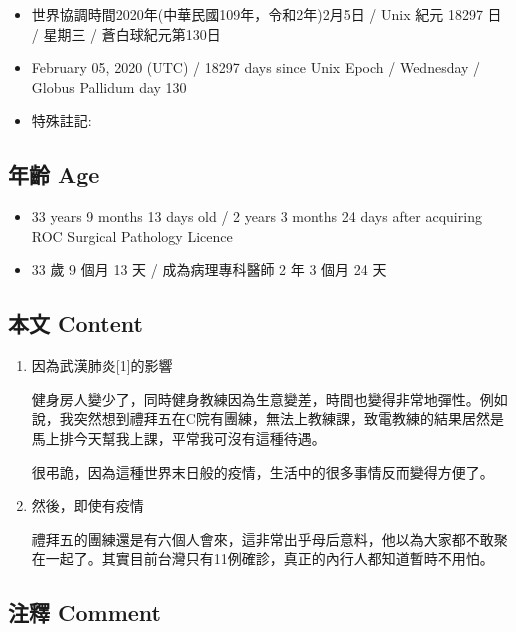 \documentclass[a5paper, 12pt
]{book}
\providecommand{\tightlist}{%
  \setlength{\itemsep}{0pt}\setlength{\parskip}{0pt}}
\begin{document}
\begin{itemize}
\tightlist
\item
  世界協調時間2020年(中華民國109年，令和2年)2月5日 / Unix 紀元 18297 日
  / 星期三 / 蒼白球紀元第130日
\item
  February 05, 2020 (UTC) / 18297 days since Unix Epoch / Wednesday /
  Globus Pallidum day 130
\item
  特殊註記:
\end{itemize}

\hypertarget{ux5e74ux9f61-age-66}{%
\subsection{年齡 Age}\label{ux5e74ux9f61-age-66}}

\begin{itemize}
\tightlist
\item
  33 years 9 months 13 days old / 2 years 3 months 24 days after
  acquiring ROC Surgical Pathology Licence
\item
  33 歲 9 個月 13 天 / 成為病理專科醫師 2 年 3 個月 24 天
\end{itemize}

\hypertarget{ux672cux6587-content-66}{%
\subsection{本文 Content}\label{ux672cux6587-content-66}}

\begin{enumerate}
\def\labelenumi{\arabic{enumi}.}
\item
  因為武漢肺炎{[}1{]}的影響

  健身房人變少了，同時健身教練因為生意變差，時間也變得非常地彈性。例如說，我突然想到禮拜五在C院有團練，無法上教練課，致電教練的結果居然是馬上排今天幫我上課，平常我可沒有這種待遇。

  很弔詭，因為這種世界末日般的疫情，生活中的很多事情反而變得方便了。
\item
  然後，即使有疫情

  禮拜五的團練還是有六個人會來，這非常出乎母后意料，他以為大家都不敢聚在一起了。其實目前台灣只有11例確診，真正的內行人都知道暫時不用怕。
\end{enumerate}

\hypertarget{ux6ce8ux91cb-comment-65}{%
\subsection{注釋 Comment}\label{ux6ce8ux91cb-comment-65}}
\end{document}
